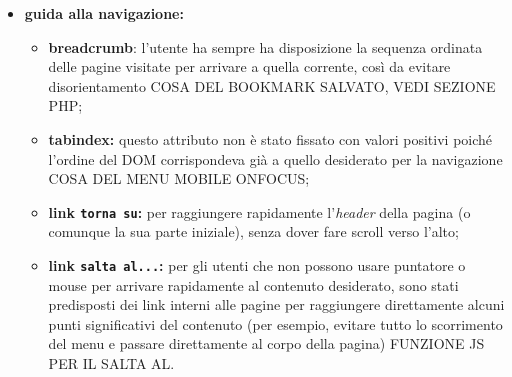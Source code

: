 \begin{itemize}
	\item \textbf{guida alla navigazione:}
	\begin{itemize}
		\item \textbf{breadcrumb}: l'utente ha sempre ha disposizione la sequenza ordinata delle pagine visitate per arrivare a quella corrente, così da evitare disorientamento COSA DEL BOOKMARK SALVATO, VEDI SEZIONE PHP;
		\item \textbf{tabindex:} questo attributo non è stato fissato con valori positivi poiché l'ordine del DOM corrispondeva già a quello desiderato per la navigazione COSA DEL MENU MOBILE ONFOCUS;
		\item \textbf{link \texttt{torna su}:} per raggiungere rapidamente l'\textit{header} della pagina (o comunque la sua parte iniziale), senza dover fare scroll verso l'alto;
		\item \textbf{link \texttt{salta al...}:} per gli utenti che non possono usare puntatore o mouse per arrivare rapidamente al contenuto desiderato, sono stati predisposti dei link interni alle pagine per raggiungere direttamente alcuni punti significativi del contenuto (per esempio, evitare tutto lo scorrimento del menu e passare direttamente al corpo della pagina) FUNZIONE JS PER IL SALTA AL.
	\end{itemize}
\end{itemize}
